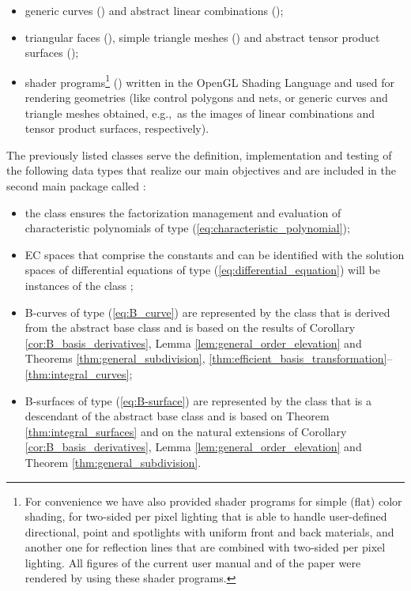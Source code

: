 \documentclass[b5paper, twosided]{book}
\newcommand{\CBlue}[1]{{\color[rgb]{0.0, 0.0, 0.9}{#1}}}
\begin{document}
\begin{itemize}
    \item
    generic curves (\CBlue{GenericCurve3}) and abstract linear combinations (\CBlue{LinearCombination3});
    \item
    triangular faces (\CBlue{TriangularFace}), simple triangle meshes (\CBlue{TriangleMesh3}) and abstract tensor product surfaces (\CBlue{TensorProductSurface3});
    \item
    shader programs\footnote{For convenience we have also provided shader programs for simple (flat) color shading, for two-sided per pixel lighting that is able to handle user-defined directional, point and spotlights with uniform front and back materials, and another one for reflection lines that are combined with two-sided per pixel lighting. All figures of the current user manual and of the paper \citep{Roth2018a} were rendered by using these shader programs. 
    } (\CBlue{ShaderProgram}) written in the OpenGL Shading Language and used for rendering geometries (like control polygons and nets, or generic curves and triangle meshes obtained, e.g.,\ as the images of linear combinations and tensor product surfaces, respectively).
\end{itemize}

The previously listed classes serve the definition, implementation and testing of the following data types that realize our main objectives and are included in the second main package called \CBlue{\textbf{EC}}:

\begin{itemize}
    \item
    the class \CBlue{CharacteristicPolynomial} ensures the factorization management and evaluation of characteristic polynomials of type (\ref{eq:characteristic_polynomial});
    
    \item
    EC spaces that comprise the constants and can be identified with the solution spaces of differential equations of type (\ref{eq:differential_equation}) will be instances of the class \CBlue{ECSpace};
    
    \item
    B-curves of type (\ref{eq:B_curve}) are represented by the class \CBlue{BCurve3} that is derived from the abstract base class \CBlue{LinearCombination3} and is based on the results of Corollary \ref{cor:B_basis_derivatives}, Lemma \ref{lem:general_order_elevation} and Theorems \ref{thm:general_subdivision},  \ref{thm:efficient_basis_transformation}--\ref{thm:integral_curves};
    
    \item
    B-surfaces of type (\ref{eq:B-surface}) are represented by the class \CBlue{BSurface3} that is a descendant of the abstract base class \CBlue{TensorProductSurface3} and is based on Theorem \ref{thm:integral_surfaces} and on the natural extensions of Corollary \ref{cor:B_basis_derivatives}, Lemma \ref{lem:general_order_elevation} and Theorem \ref{thm:general_subdivision}.
\end{itemize}
\end{document}
